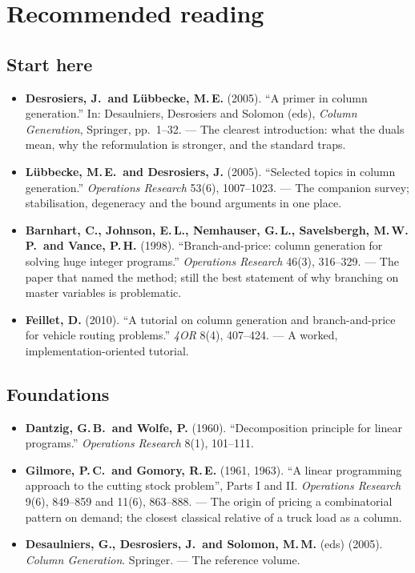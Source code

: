 \documentclass[11pt,a4paper]{article}
\begin{document}
\section{Recommended reading}

\subsection*{Start here}

\begin{itemize}[leftmargin=1.4em]
\item \textbf{Desrosiers, J.\ and L\"ubbecke, M.\,E.} (2005). ``A primer in
column generation.'' In: Desaulniers, Desrosiers and Solomon (eds),
\emph{Column Generation}, Springer, pp.\ 1--32. --- The clearest introduction:
what the duals mean, why the reformulation is stronger, and the standard traps.
\item \textbf{L\"ubbecke, M.\,E.\ and Desrosiers, J.} (2005). ``Selected topics
in column generation.'' \emph{Operations Research} 53(6), 1007--1023. --- The
companion survey; stabilisation, degeneracy and the bound arguments in one
place.
\item \textbf{Barnhart, C., Johnson, E.\,L., Nemhauser, G.\,L., Savelsbergh,
M.\,W.\,P.\ and Vance, P.\,H.} (1998). ``Branch-and-price: column generation for
solving huge integer programs.'' \emph{Operations Research} 46(3), 316--329. ---
The paper that named the method; still the best statement of why branching on
master variables is problematic.
\item \textbf{Feillet, D.} (2010). ``A tutorial on column generation and
branch-and-price for vehicle routing problems.'' \emph{4OR} 8(4), 407--424. ---
A worked, implementation-oriented tutorial.
\end{itemize}

\subsection*{Foundations}

\begin{itemize}[leftmargin=1.4em]
\item \textbf{Dantzig, G.\,B.\ and Wolfe, P.} (1960). ``Decomposition principle
for linear programs.'' \emph{Operations Research} 8(1), 101--111.
\item \textbf{Gilmore, P.\,C.\ and Gomory, R.\,E.} (1961, 1963). ``A linear
programming approach to the cutting stock problem'', Parts I and II.
\emph{Operations Research} 9(6), 849--859 and 11(6), 863--888. --- The origin of
pricing a combinatorial pattern on demand; the closest classical relative of a
truck load as a column.
\item \textbf{Desaulniers, G., Desrosiers, J.\ and Solomon, M.\,M.} (eds)
(2005). \emph{Column Generation}. Springer. --- The reference volume.
\end{itemize}
\end{document}
